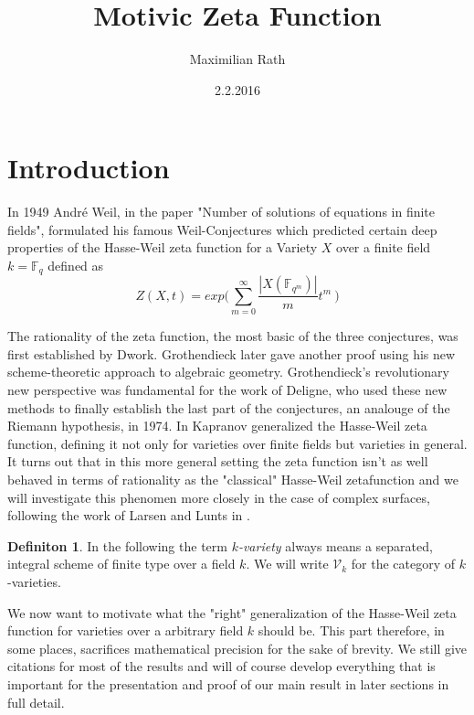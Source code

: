 \documentclass[11pt, a4paper, german]{article}
\author{Maximilian Rath}
\date{2.2.2016}
\title{Motivic Zeta Function}
\theoremstyle{plain}
\theoremstyle{definition}
\newtheorem{definition}[theorem]{Definiton}
\begin{document}
\maketitle
\section{Introduction}

In 1949 Andr\'e Weil, in the paper "Number of solutions of equations in finite fields", formulated his famous Weil-Conjectures
which predicted certain deep properties of the Hasse-Weil zeta function for a Variety $X$ over a finite field $k = \mathbb{F}_q$ defined as
\[
    Z(X,t) = exp \big(\sum_{m=0}^\infty \frac{|X(\mathbb{F}_{q^m})|}{m} t^m \ \big)
\]

The rationality of the zeta function, the most basic of the three conjectures, was first established by Dwork. Grothendieck later gave another
proof using his new scheme-theoretic approach to algebraic geometry.
Grothendieck's revolutionary new perspective was fundamental for the work of Deligne, who used these new methods to finally establish the 
last part of the conjectures, an analouge of the Riemann hypothesis, in 1974.
In \cite{kapranov} Kapranov generalized the Hasse-Weil zeta function, defining it not only for varieties over finite fields
but varieties in general. It turns out that in this more general setting the zeta function isn't as well behaved in terms of rationality as
the "classical" Hasse-Weil zetafunction and we will investigate this phenomen more closely in the case of complex surfaces, following the 
work of Larsen and Lunts in \cite{MR1996804}.

\begin{definition}
    In the following the term \emph{$k$-variety} always means a separated, integral scheme of finite type over a field $k$.
    We will write $\mathcal{V}_k$ for the category of $k$-varieties.
\end{definition}

We now want to motivate what the "right" generalization of the Hasse-Weil zeta function for varieties over a arbitrary field $k$ should be.
This part therefore, in some places, sacrifices mathematical precision for the sake of brevity.  
We still give citations for most of the results and will of course develop everything that is important for the presentation and proof 
of our main result in later sections in full detail.
\end{document}
